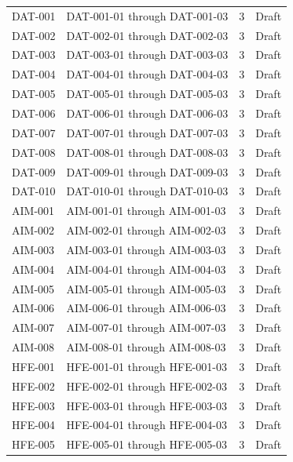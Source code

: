 \documentclass[11pt,letterpaper]{article}
\begin{document}
\begin{small}
\begin{longtable}{@{}L{0.14\textwidth}L{0.56\textwidth}L{0.12\textwidth}L{0.10\textwidth}@{}}
\addlinespace[2pt]
DAT-001 & DAT-001-01 through DAT-001-03 & 3 & Draft \\
\addlinespace[2pt]
DAT-002 & DAT-002-01 through DAT-002-03 & 3 & Draft \\
\addlinespace[2pt]
DAT-003 & DAT-003-01 through DAT-003-03 & 3 & Draft \\
\addlinespace[2pt]
DAT-004 & DAT-004-01 through DAT-004-03 & 3 & Draft \\
\addlinespace[2pt]
DAT-005 & DAT-005-01 through DAT-005-03 & 3 & Draft \\
\addlinespace[2pt]
DAT-006 & DAT-006-01 through DAT-006-03 & 3 & Draft \\
\addlinespace[2pt]
DAT-007 & DAT-007-01 through DAT-007-03 & 3 & Draft \\
\addlinespace[2pt]
DAT-008 & DAT-008-01 through DAT-008-03 & 3 & Draft \\
\addlinespace[2pt]
DAT-009 & DAT-009-01 through DAT-009-03 & 3 & Draft \\
\addlinespace[2pt]
DAT-010 & DAT-010-01 through DAT-010-03 & 3 & Draft \\
\addlinespace[2pt]
AIM-001 & AIM-001-01 through AIM-001-03 & 3 & Draft \\
\addlinespace[2pt]
AIM-002 & AIM-002-01 through AIM-002-03 & 3 & Draft \\
\addlinespace[2pt]
AIM-003 & AIM-003-01 through AIM-003-03 & 3 & Draft \\
\addlinespace[2pt]
AIM-004 & AIM-004-01 through AIM-004-03 & 3 & Draft \\
\addlinespace[2pt]
AIM-005 & AIM-005-01 through AIM-005-03 & 3 & Draft \\
\addlinespace[2pt]
AIM-006 & AIM-006-01 through AIM-006-03 & 3 & Draft \\
\addlinespace[2pt]
AIM-007 & AIM-007-01 through AIM-007-03 & 3 & Draft \\
\addlinespace[2pt]
AIM-008 & AIM-008-01 through AIM-008-03 & 3 & Draft \\
\addlinespace[2pt]
HFE-001 & HFE-001-01 through HFE-001-03 & 3 & Draft \\
\addlinespace[2pt]
HFE-002 & HFE-002-01 through HFE-002-03 & 3 & Draft \\
\addlinespace[2pt]
HFE-003 & HFE-003-01 through HFE-003-03 & 3 & Draft \\
\addlinespace[2pt]
HFE-004 & HFE-004-01 through HFE-004-03 & 3 & Draft \\
\addlinespace[2pt]
HFE-005 & HFE-005-01 through HFE-005-03 & 3 & Draft \\

\end{longtable}
\end{small}
\end{document}
